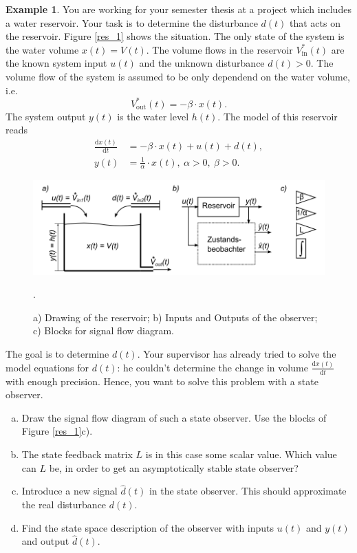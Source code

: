 \documentclass[a4paper,12 pt]{article}
\numberwithin{equation}{section}
\theoremstyle{definition}
\newtheorem{bsp}{Example}
\theoremstyle{remark}
\theoremstyle{definition}
\theoremstyle{definition}
\theoremstyle{definition}
\theoremstyle{remark}
\begin{document}
\newpage
\begin{bsp}
You are working for your semester thesis at a project which includes a water reservoir. Your task is to determine the disturbance $d(t)$ that acts on the reservoir. Figure \ref{res_1} shows the situation. The only state of the system is the water volume $x(t)=V(t)$. The volume flows in the reservoir $V_{\text{in}}^*(t)$ are the known system input $u(t)$ and the unknown disturbance $d(t)>0$. The volume flow of the system is assumed to be only dependend on the water volume, i.e.
\begin{equation*}
V_{\text{out}}^*(t)=-\beta \cdot x(t).
\end{equation*}
The system output $y(t)$ is the water level $h(t)$. The model of this reservoir reads
\begin{equation}
\begin{split}
\frac{\text{d}x(t)}{\text{d}t}&=-\beta \cdot x(t) + u(t) + d(t),\\
y(t)&= \frac{1}{\alpha} \cdot x(t), \ \alpha>0, \ \beta>0.
\end{split}
\end{equation}




\begin{figure}[h!]
\centering
\includegraphics[width=0.75\columnwidth]{reservoir}
\caption{a) Drawing of the reservoir; b) Inputs and Outputs of the observer; c) Blocks for signal flow diagram.}
\label{fig:res_1}.
\end{figure}
The goal is to determine $d(t)$. Your supervisor has already tried to solve the model equations for $d(t)$: he couldn't determine the change in volume  $\frac{\text{d}x(t)}{\text{d}t}$ with enough precision. Hence, you want to solve this problem with a state observer.
\begin{enumerate}[(a)]
\item Draw the signal flow diagram of such a state observer. Use the blocks of Figure \ref{res_1}c).
\item The state feedback matrix $L$ is in this case some scalar value. Which value can $L$ be, in order to get an asymptotically stable state observer?
\item Introduce a new signal $\hat{d}(t)$ in the state observer. This should approximate the real disturbance $d(t)$.
\item Find the state space description of the observer with inputs $u(t)$ and $y(t)$ and output $\hat{d}(t)$.
\end{enumerate}


\end{bsp}
\end{document}
